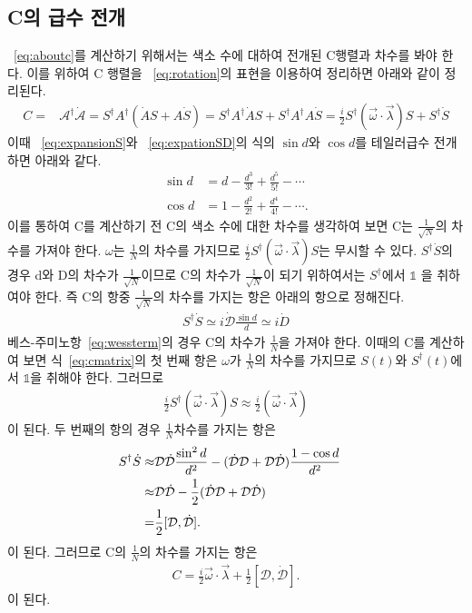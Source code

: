 \documentclass[superscriptaddress,
nofootinbib,byrevtex,fleqn,prd,12pt]{revtex4}
\begin{document}
\subsection{C의 급수 전개}\label{55}
~\eqref{eq:aboutc}를 계산하기 위해서는 색소 수에 대하여 전개된 C행렬과 차수를 봐야 한다. 이를 위하여 C 행렬을 ~\eqref{eq:rotation}의 표현을 이용하여 정리하면 아래와 같이 정리된다.
\begin{align}
  C=&\mathcal{A}^\dagger\dot{\mathcal{A}}= S^\dagger A^\dagger(\dot{A}S+A\dot{S})=S^\dagger A^\dagger\dot{A}S
  +S^\dagger A^\dagger A\dot{S}=\frac{i}{2}S^\dagger(\vec{\omega}\cdot\vec{\lambda})S+S^\dagger\dot{S}\label{eq:cmatrix}
\end{align}
이때 ~\eqref{eq:expansionS}와 ~\eqref{eq:expationSD}의 식의 $\sin d$와 $\cos d$를 테일러급수 전개하면 아래와 같다.
\begin{align}
  \sin d&=d-\frac{d^3}{3!}+\frac{d^5}{5!}-\cdots\\
  \cos d&=1-\frac{d^2}{2!}+\frac{d^4}{4!}-\cdots.
\end{align}
이를 통하여 C를 계산하기 전 C의 색소 수에 대한 차수를 생각하여 보면 C는 $\frac{1}{\sqrt{N}} $의 차수를 가져야 한다. $\omega$는 $\frac{1}{N}$의 차수를 가지므로 $\frac{i}{2}S^\dagger(\vec{\omega}\cdot\vec{\lambda})S $는 무시할 수 있다. $ S^\dagger\dot{S} $의 경우 d와 D의 차수가 $ \frac{1}{\sqrt{N}}$이므로
C의 차수가 $\frac{1}{\sqrt{N}}$이 되기 위하여서는 $ S^\dagger $에서 $\mathbb{1}$ 을 취하여야 한다. 즉 C의 항중 $ \frac{1}{\sqrt{N}} $의 차수를 가지는 항은 아래의 항으로 정해진다.
\begin{align}
  S^\dagger\dot{S}\simeq i\dot{\mathcal{D}}\frac{\sin d}{d}\simeq i\dot{D}
\end{align}
베스-주미노항~\eqref{eq:wessterm}의 경우 C의 차수가 $ \frac{1}{N} $을 가져야 한다. 이때의 C를 계산하여 보면 식~\eqref{eq:cmatrix}의 첫 번째 항은 $\omega$가 $\frac{1}{N}$의 차수를 가지므로 $S(t) $와 $ S^{\dagger}(t) $에서 $\mathbb{1}$을 취해야 한다. 그러므로
\begin{align}
  \frac{i}{2}S^{\dagger}(\vec{\omega} \cdot \vec{\lambda}) S \approx \frac{i}{2}(\vec{\omega}\cdot \vec{\lambda})
\end{align}
이 된다. 두 번째의 항의 경우 $\frac{1}{N}$차수를 가지는 항은
\begin{align}
  S^\dagger\dot{S}\approx & \mathcal{D}\dot{\mathcal{D}}\frac{\sin^2d}{d^2}-(\dot{\mathcal{D}}\mathcal{D}+\mathcal{D}\dot{\mathcal{D}})
  \frac{1-\cos d}{d^2}\cr
  \approx& \mathcal{D}\dot{\mathcal{D}}-\frac{1}{2}(\dot{\mathcal{D}}\mathcal{D}+\mathcal{D}\dot{\mathcal{D}}) \cr
  =&\frac{1}{2}[\mathcal{D},\mathcal{\dot{D}}].
\end{align}
이 된다. 그러므로 C의 $\frac{1}{N}$의 차수를 가지는 항은
\begin{align}
  C=\frac{i}{2}\vec{\omega}\cdot{\vec{\lambda}}+\frac{1}{2}[\mathcal{D},\mathcal{\dot{D}}].
\end{align}
이 된다.
\newpage
\end{document}

